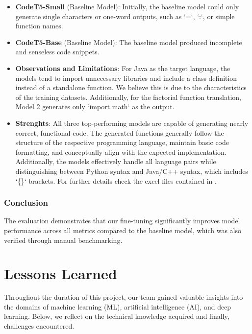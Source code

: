 \documentclass[conference]{IEEEtran}
\begin{document}
\begin{itemize}
    \item \textbf{CodeT5-Small} (Baseline Model): 
    Initially, the baseline model could only generate single characters or one-word outputs, such as `=`, `:`, or simple function names. 
    \item \textbf{CodeT5-Base} (Baseline Model):
    The baseline model produced incomplete and senseless code snippets.
    \item
    \textbf{Observations and Limitations}:
    For Java as the target language, the models tend to import unnecessary libraries and include a class definition instead of a standalone function. We believe this is due to the characteristics of the training datasets. Additionally, for the factorial function translation, Model 2 generates only `import math` as the output. 
    \item \textbf{Strenghts}:
    All three top-performing models are capable of generating nearly correct, functional code. The generated functions generally follow the structure of the respective programming language, maintain basic code formatting, and conceptually align with the expected implementation. Additionally, the models effectively handle all language pairs while distinguishing between Python syntax and Java/C++ syntax, which includes `\{\}` brackets. 
    For further details check the excel files contained in \cite{b1}.
    \\    
\end{itemize}


\subsubsection{Conclusion}
The evaluation demonstrates that our fine-tuning significantly improves model performance across all metrics compared to the baseline model, which was also verified through manual benchmarking.

\section{Lessons Learned}\label{learn}
Throughout the duration of this project, our team gained valuable insights into the domains of machine learning (ML), artificial intelligence (AI), and deep learning. Below, we reflect on the technical knowledge acquired and finally, challenges encountered.
\end{document}

